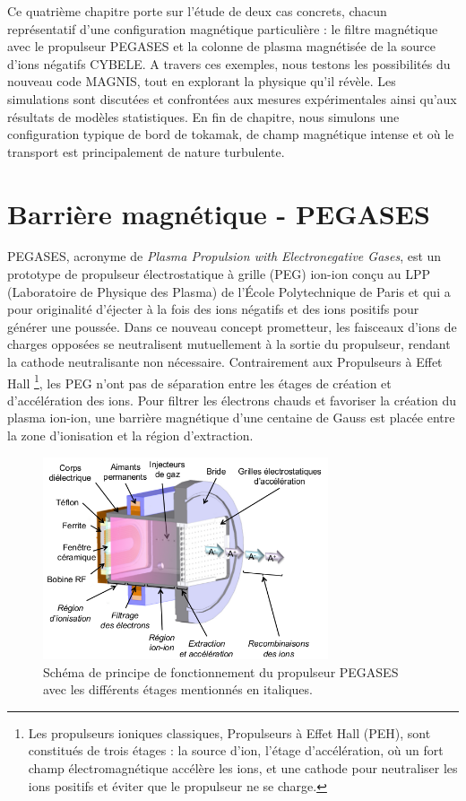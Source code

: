 \begin{refsection}
Ce quatrième chapitre porte sur l'étude de deux cas concrets,
chacun représentatif d'une configuration magnétique particulière : le filtre
magnétique avec le propulseur PEGASES et la colonne de plasma magnétisée de la
source d'ions négatifs CYBELE. 
A travers ces exemples, nous testons les possibilités du nouveau code MAGNIS,
tout en explorant la physique qu'il révèle. Les simulations sont discutées et
confrontées aux mesures expérimentales ainsi qu'aux résultats de modèles
statistiques.
En fin de chapitre, nous simulons une configuration typique de bord de tokamak,
de champ magnétique intense et où le transport est principalement de nature
turbulente. 
		 
\section{Barrière magnétique - PEGASES}
PEGASES, acronyme de \emph{Plasma Propulsion with Electronegative Gases}, est
un prototype de propulseur électrostatique à grille (PEG)
ion-ion\parencite{Chabert} conçu au LPP (Laboratoire de Physique des
Plasma) de l'École Polytechnique de Paris et qui a pour originalité d'éjecter à
la fois des ions négatifs et des ions positifs pour générer une poussée. Dans ce
nouveau concept prometteur, les faisceaux d'ions de charges opposées se
neutralisent mutuellement à la sortie du propulseur, rendant la cathode
neutralisante non nécessaire. Contrairement aux Propulseurs à Effet Hall
\footnote{Les propulseurs ioniques classiques, Propulseurs à Effet Hall (PEH),
sont constitués de trois étages : la source d'ion, l'étage d'accélération, où un
fort champ électromagnétique accélère les ions, et une cathode pour neutraliser
les ions positifs et éviter que le propulseur ne se charge.}, les PEG n'ont
pas de séparation entre les étages de création et d'accélération des ions.
Pour filtrer les électrons chauds et favoriser la création du plasma ion-ion, une
barrière magnétique d'une centaine de Gauss est placée entre la zone
d'ionisation et la région d'extraction.

\begin{figure}[htbp]
\centering
\includegraphics[width=0.75\textwidth]{figures/4-pegases3D.png}
{\caption{Schéma de principe de fonctionnement du propulseur PEGASES avec les
différents étages mentionnés en italiques\parencite{Popelier}.}
\label{4-pegases3D}}
\end{figure}


\end{refsection}
